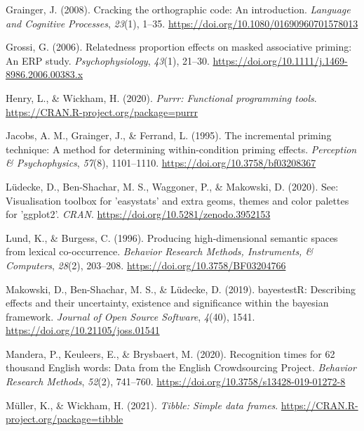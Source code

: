 \documentclass[
  english,
  man,floatsintext]{apa6}
\newlength{\cslhangindent}
\newlength{\cslentryspacingunit} %
\newenvironment{CSLReferences}[2] %
 {%
  \setlength{\parindent}{0pt}
  \ifodd #1
  \let\oldpar\par
  \def\par{\hangindent=\cslhangindent\oldpar}
  \fi
  \setlength{\parskip}{#2\cslentryspacingunit}
 }%
 {}
\begin{document}
\begin{CSLReferences}{1}{0}
\leavevmode{}%
Grainger, J. (2008). Cracking the orthographic code: An introduction. \emph{Language and Cognitive Processes}, \emph{23}(1), 1--35. \url{https://doi.org/10.1080/01690960701578013}

\leavevmode{}%
Grossi, G. (2006). Relatedness proportion effects on masked associative priming: An {ERP} study. \emph{Psychophysiology}, \emph{43}(1), 21--30. \url{https://doi.org/10.1111/j.1469-8986.2006.00383.x}

\leavevmode{}%
Henry, L., \& Wickham, H. (2020). \emph{Purrr: Functional programming tools}. \url{https://CRAN.R-project.org/package=purrr}

\leavevmode{}%
Jacobs, A. M., Grainger, J., \& Ferrand, L. (1995). The incremental priming technique: A method for determining within-condition priming effects. \emph{Perception {\&} Psychophysics}, \emph{57}(8), 1101--1110. \url{https://doi.org/10.3758/bf03208367}

\leavevmode{}%
Lüdecke, D., Ben-Shachar, M. S., Waggoner, P., \& Makowski, D. (2020). See: Visualisation toolbox for 'easystats' and extra geoms, themes and color palettes for 'ggplot2'. \emph{CRAN}. \url{https://doi.org/10.5281/zenodo.3952153}

\leavevmode{}%
Lund, K., \& Burgess, C. (1996). Producing high-dimensional semantic spaces from lexical co-occurrence. \emph{Behavior Research Methods, Instruments, \& Computers}, \emph{28}(2), 203--208. \url{https://doi.org/10.3758/BF03204766}

\leavevmode{}%
Makowski, D., Ben-Shachar, M. S., \& Lüdecke, D. (2019). bayestestR: Describing effects and their uncertainty, existence and significance within the bayesian framework. \emph{Journal of Open Source Software}, \emph{4}(40), 1541. \url{https://doi.org/10.21105/joss.01541}

\leavevmode{}%
Mandera, P., Keuleers, E., \& Brysbaert, M. (2020). Recognition times for 62 thousand English words: Data from the English Crowdsourcing Project. \emph{Behavior Research Methods}, \emph{52}(2), 741--760. \url{https://doi.org/10.3758/s13428-019-01272-8}

\leavevmode{}%
Müller, K., \& Wickham, H. (2021). \emph{Tibble: Simple data frames}. \url{https://CRAN.R-project.org/package=tibble}


\end{CSLReferences}
\end{document}
